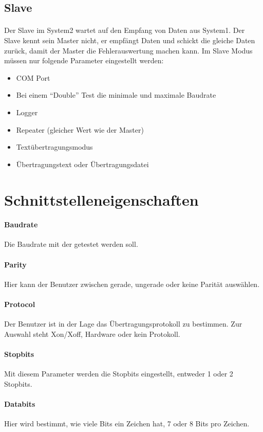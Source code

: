 \subsection{Slave}
\paragraph{}
Der Slave im System2 wartet auf den Empfang von Daten aus System1. Der Slave kennt sein Master nicht, er empfängt Daten und schickt die gleiche Daten zurück, damit der Master die Fehlerauswertung machen kann. Im Slave Modus müssen nur folgende Parameter eingestellt werden:

\begin{itemize}
\item COM Port
\item Bei einem "`Double"' Test die minimale und maximale Baudrate
\item Logger
\item Repeater (gleicher Wert wie der Master)
\item Textübertragungsmodus
\item Übertragungstext oder Übertragungsdatei
\end{itemize}


\section{Schnittstelleneigenschaften}

\paragraph{Baudrate} Die Baudrate mit der getestet werden soll.
\paragraph{Parity} Hier kann der Benutzer zwischen gerade, ungerade oder keine Parität auswählen.
\paragraph{Protocol} Der Benutzer ist in der Lage das Übertragungsprotokoll zu bestimmen. Zur Auswahl steht Xon/Xoff, Hardware oder kein Protokoll.
\paragraph{Stopbits} Mit diesem Parameter werden die Stopbits eingestellt, entweder 1 oder 2 Stopbits.
\paragraph{Databits} Hier wird bestimmt, wie viele Bits ein Zeichen hat, 7 oder 8 Bits pro Zeichen.

